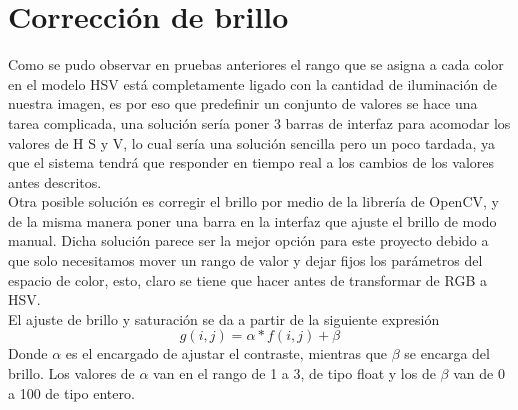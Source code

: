 \section{Corrección de brillo}
Como se pudo observar en pruebas anteriores el rango que se asigna a cada color en el modelo HSV está
completamente ligado con la cantidad de iluminación de nuestra imagen, es por eso que predefinir
un conjunto de valores se hace una tarea complicada, una solución sería poner 3 barras de interfaz
para acomodar los valores de H S y V, lo cual sería una solución sencilla pero un poco tardada, ya que
el sistema tendrá que responder en tiempo real a los cambios de los valores antes descritos.\\
Otra posible solución es corregir el brillo por medio de la librería de OpenCV,
y de la misma manera poner una barra en la interfaz que ajuste el brillo de modo manual. Dicha solución
parece ser la mejor opción para este proyecto debido a que solo necesitamos mover un rango de valor y dejar
fijos los parámetros del espacio de color, esto, claro se tiene que hacer antes de transformar de RGB
a HSV.\\
El ajuste de brillo y saturación se da a partir de la siguiente expresión
\begin{equation}
	g(i,j) = \alpha * f(i,j) + \beta
\end{equation}
Donde $\alpha$ es el encargado de ajustar el contraste, mientras que $\beta$ se encarga del brillo.
Los valores de $\alpha$ van en el rango de 1 a 3, de tipo float y los de $\beta$ van de 0 a 100 de tipo entero.


